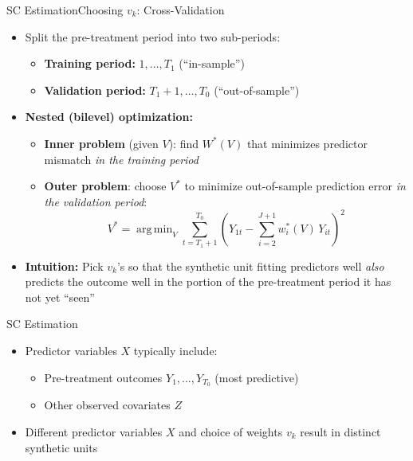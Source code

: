 \documentclass[hyperref={pdfpagelabels=false}]{beamer}
\DeclareMathOperator*{\argmin}{arg\,min}
\begin{document}
\begin{frame}{SC Estimation}{Choosing $v_k$: Cross-Validation}
\begin{itemize}
	\item Split the pre-treatment period into two sub-periods:
	\vspace{0.2cm}
	\begin{itemize}
		\item \textbf{Training period:} $1,\ldots,T_1$ \quad (``in-sample'')
		\vspace{0.2cm}
		\item \textbf{Validation period:} $T_1{+}1,\ldots,T_0$ \quad (``out-of-sample'')
	\end{itemize}
	\vspace{0.2cm}
	\item \textbf{Nested (bilevel) optimization:}
	\vspace{0.1cm}
	\begin{itemize}
		\item \textbf{Inner problem} (given $V$): find $W^{*}(V)$ that minimizes predictor mismatch \textit{in the training period}
		\vspace{0.1cm}
		\item \textbf{Outer problem}: choose $V^{*}$ to minimize out-of-sample prediction error \textit{in the validation period}:
		\begin{equation*}
			V^{*} = \argmin_{V} \sum_{t=T_1+1}^{T_0}
			\left(Y_{1t} - \sum_{i=2}^{J+1} w^{*}_{i}(V)\,Y_{it}\right)^{2}
		\end{equation*}
	\end{itemize}
	\item \textbf{Intuition:} Pick $v_k$'s so that the synthetic unit fitting predictors well \textit{also} predicts the outcome well in the portion of the pre-treatment period it has not yet ``seen''
\end{itemize}
\end{frame}





\begin{frame}{SC Estimation}
	\begin{itemize}
		
	\item Predictor variables $X$ typically include:
				\vspace{0.2cm}
			\begin{itemize}
					\item Pre-treatment outcomes $Y_{1},...,Y_{T_0}$ (most predictive)
								\vspace{0.2cm}
					\item Other observed covariates $Z$ 
				\end{itemize}
			\vspace{0.2cm}
			\item Different predictor variables $X$ and choice of weights $v_k$ result in distinct synthetic units
	\end{itemize}
\end{frame}
\end{document}
